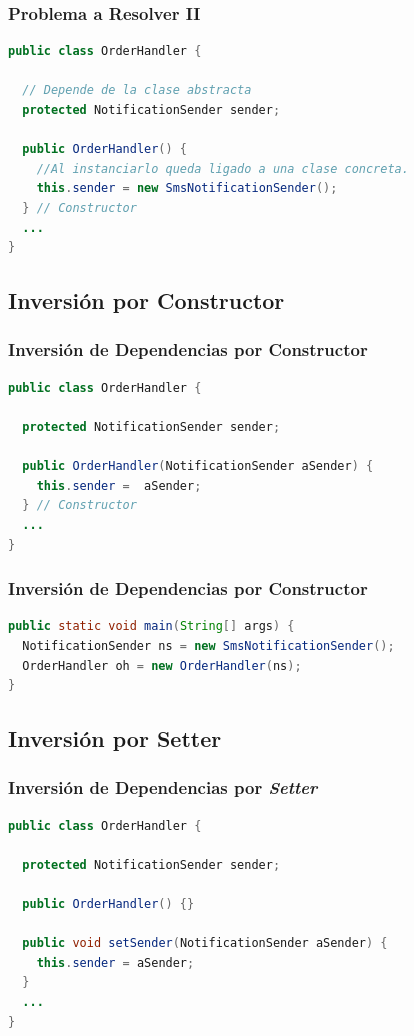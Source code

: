 \documentclass[a4paper,t,xcolor=pst,dvips,colortheme]{beamer}
\begin{document}
\begin{frame}[c,fragile]
	\frametitle{Problema a Resolver II}
\begin{lstlisting}[basicstyle=\small,language=Java]
public class OrderHandler {

  // Depende de la clase abstracta
  protected NotificationSender sender;

  public OrderHandler() {
    //Al instanciarlo queda ligado a una clase concreta.
    this.sender = new SmsNotificationSender();
  } // Constructor
  ...
}
\end{lstlisting}
\end{frame}

\subsection{Inversión por Constructor}

\begin{frame}[c,fragile]
	\frametitle{Inversión de Dependencias por Constructor}
\begin{lstlisting}[basicstyle=\footnotesize,language=Java]
public class OrderHandler {

  protected NotificationSender sender;
	
  public OrderHandler(NotificationSender aSender) {
	this.sender =  aSender;
  } // Constructor
  ...
}
\end{lstlisting}
\end{frame}

\begin{frame}[c,fragile]
	\frametitle{Inversión de Dependencias por Constructor}
\begin{lstlisting}[basicstyle=\footnotesize,language=Java]
public static void main(String[] args) {
  NotificationSender ns = new SmsNotificationSender();
  OrderHandler oh = new OrderHandler(ns);
}
\end{lstlisting}
\end{frame}

\subsection{Inversión por Setter}

\begin{frame}[c,fragile]
	\frametitle{Inversión de Dependencias por \emph{Setter}}
\begin{lstlisting}[basicstyle=\footnotesize,language=Java]
public class OrderHandler {

  protected NotificationSender sender;
	
  public OrderHandler() {}
	
  public void setSender(NotificationSender aSender) {
    this.sender = aSender;
  }
  ...
}
\end{lstlisting}
\end{frame}
\end{document}
